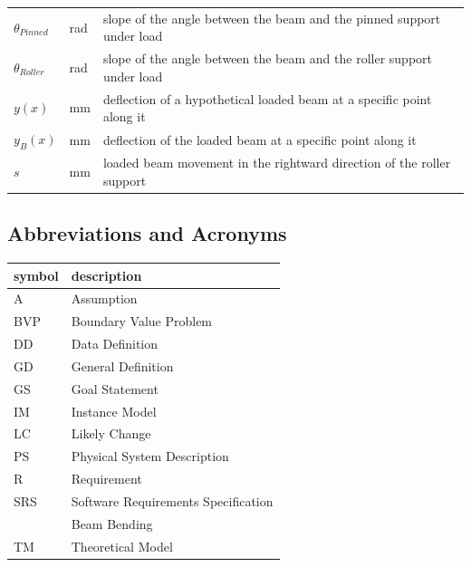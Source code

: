 \documentclass[12pt]{article}
\begin{document}
\begin{longtable*}{l l p{12cm}}
    \(\theta{}_{\mathit{Pinned}}\) & \si{\radian} & slope of the angle between the beam and the pinned support under load \\
    \(\theta{}_{\mathit{Roller}}\) & \si{\radian} & slope of the angle between the beam and the roller support under load \\
    \(y(x)\) & \si{\milli\metre} & deflection of a hypothetical loaded beam at a specific point along it \\
    \(y_{B}(x)\) & \si{\milli\metre} & deflection of the loaded beam at a specific point along it \\
    \(s\) & \si{\milli\metre} & loaded beam movement in the rightward direction of the roller support \\
    \bottomrule
\end{longtable*}

\subsection{Abbreviations and Acronyms}

\renewcommand{\arraystretch}{1.2}

\begin{center}
    \begin{tabular}{l l}
        \toprule
        \textbf{symbol} & \textbf{description}                \\
        \midrule
        A               & Assumption                          \\
        BVP             & Boundary Value Problem              \\
        DD              & Data Definition                     \\
        GD              & General Definition                  \\
        GS              & Goal Statement                      \\
        IM              & Instance Model                      \\
        LC              & Likely Change                       \\
        PS              & Physical System Description         \\
        R               & Requirement                         \\
        SRS             & Software Requirements Specification \\
        \progname{}     & Beam Bending                        \\
        TM              & Theoretical Model                   \\
        \bottomrule
    \end{tabular}
\end{center}
\end{document}
